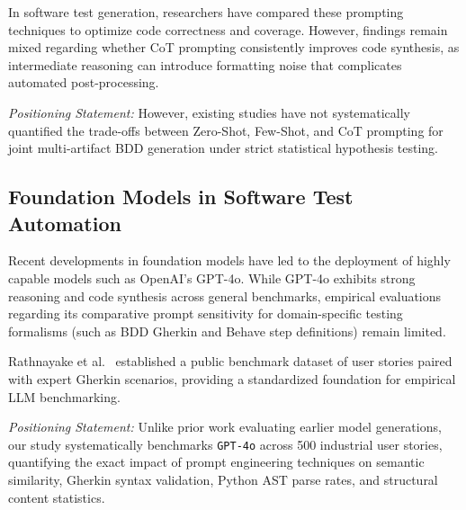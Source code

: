 In software test generation, researchers have compared these prompting techniques to optimize code correctness and coverage. However, findings remain mixed regarding whether CoT prompting consistently improves code synthesis, as intermediate reasoning can introduce formatting noise that complicates automated post-processing.

\textit{Positioning Statement:} However, existing studies have not systematically quantified the trade-offs between Zero-Shot, Few-Shot, and CoT prompting for joint multi-artifact BDD generation under strict statistical hypothesis testing.

\subsection{Foundation Models in Software Test Automation}
Recent developments in foundation models have led to the deployment of highly capable models such as OpenAI's GPT-4o. While GPT-4o exhibits strong reasoning and code synthesis across general benchmarks, empirical evaluations regarding its comparative prompt sensitivity for domain-specific testing formalisms (such as BDD Gherkin and Behave step definitions) remain limited.

Rathnayake et al.~\cite{rathnayake2026} established a public benchmark dataset of user stories paired with expert Gherkin scenarios, providing a standardized foundation for empirical LLM benchmarking.

\textit{Positioning Statement:} Unlike prior work evaluating earlier model generations, our study systematically benchmarks \texttt{GPT-4o} across 500 industrial user stories, quantifying the exact impact of prompt engineering techniques on semantic similarity, Gherkin syntax validation, Python AST parse rates, and structural content statistics.
